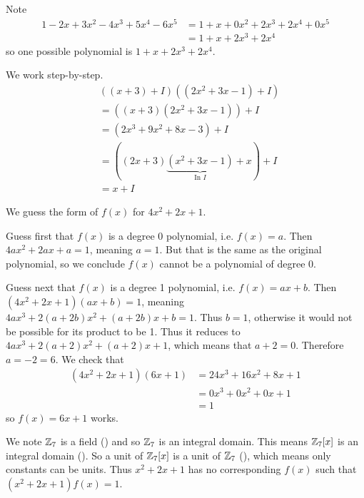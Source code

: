 \begin{questions}
    \item Note
    \begin{align*}
        1 - 2x + 3x^2 - 4x^3 + 5x^4 - 6x^5 &= 1 + x + 0x^2 + 2x^3 + 2x^4 + 0x^5\\
        &= 1 + x + 2x^3 + 2x^4
    \end{align*}
    so one possible polynomial is $1 + x + 2x^3 + 2x^4$.

    \item We work step-by-step.
    \begin{align*}
        &\left((x + 3) + I\right)\left((2x^2 + 3x - 1) + I\right)\\
        &= \left((x + 3)(2x^2+3x-1)\right) + I\\
        &= \left(2x^3 + 9x^2 + 8x - 3\right) + I\\
        &= \left((2x+3)\underbrace{(x^2+3x-1)}_{\text{In }I} + x\right) + I\\
        &= x + I
    \end{align*}

    \item \begin{partquestions}{\alph*}
        \item We guess the form of $f(x)$ for $4x^2 + 2x + 1$.

        Guess first that $f(x)$ is a degree 0 polynomial, i.e. $f(x) = a$. Then $4ax^2 + 2ax + a = 1$, meaning $a = 1$. But that is the same as the original polynomial, so we conclude $f(x)$ cannot be a polynomial of degree 0.

        Guess next that $f(x)$ is a degree 1 polynomial, i.e. $f(x) = ax + b$. Then $(4x^2+2x+1)(ax+b) = 1$, meaning $4ax^3 + 2(a+2b)x^2 + (a+2b)x + b = 1$. Thus $b = 1$, otherwise it would not be possible for its product to be 1. Thus it reduces to $4ax^3 + 2(a+2)x^2 + (a+2)x + 1$, which means that $a+2 = 0$. Therefore $a = -2 = 6$. We check that
        \begin{align*}
            (4x^2+2x+1)(6x+1) &= 24x^3 + 16x^2 + 8x + 1\\
            &= 0x^3 + 0x^2 + 0x + 1\\
            &= 1
        \end{align*}
        so $f(x) = 6x+1$ works.

        \item We note $\mathbb{Z}_7$ is a field () and so $\mathbb{Z}_7$ is an integral domain. This means $\mathbb{Z}_7[x]$ is an integral domain (). So a unit of $\mathbb{Z}_7[x]$ is a unit of $\mathbb{Z}_7$ (), which means only constants can be units. Thus $x^2 + 2x + 1$ has no corresponding $f(x)$ such that $(x^2+2x+1)f(x) = 1$.
    \end{partquestions}


\end{questions}
